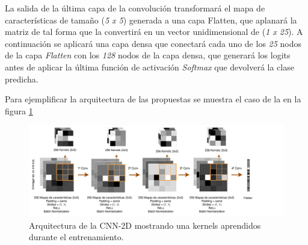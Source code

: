 \begin{enumerate}
                La salida de la última capa de la convolución transformará el mapa de características de tamaño (\textit{5 x 5}) generada a una capa Flatten, que aplanará la matriz de tal forma que la convertirá en un vector unidimensional de (\textit{1 x 25}). A continuación se aplicará una capa densa que conectará cada uno de los \textit{25} nodos de la capa \textit{Flatten} con los \textit{128} nodos de la capa densa, que generará los logits antes de aplicar la última función de activación \textit{Softmax} que devolverá la clase predicha.


                Para ejemplificar la arquitectura de las  propuestas se muestra el caso de la  en la figura \ref{TASPCNNIMAGE}


                \begin{figure}[h]
                    \centering
                    \includegraphics[width=17cm]{archivos/4.Metodologia/Modelos/CNN/2D/TASPCNN}
                    \caption{Arquitectura de la CNN-2D mostrando una  kernels aprendidos durante el entrenamiento.}
                    \label{TASPCNNIMAGE}
                 \end{figure}


        \end{enumerate}

        \cite{AutoSklearn}

\newpage
